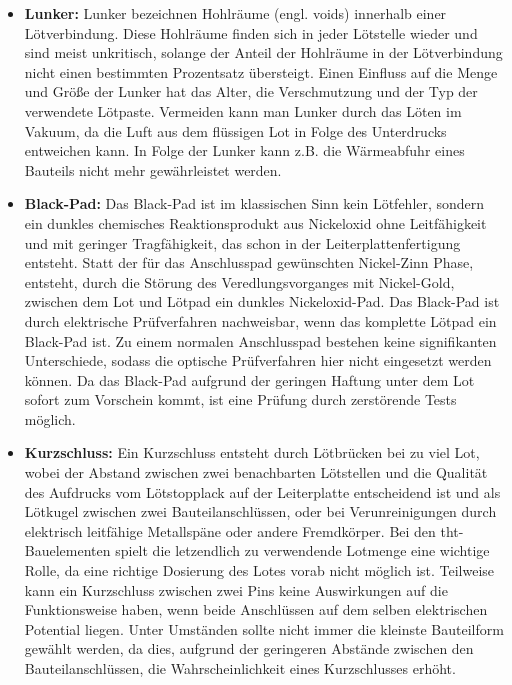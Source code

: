 \begin{itemize}
            \item \textbf{Lunker:} Lunker bezeichnen Hohlräume (engl. voids) innerhalb einer Lötverbindung. Diese Hohlräume finden sich in jeder Lötstelle wieder und sind meist unkritisch, solange der Anteil der Hohlräume in der Lötverbindung nicht einen bestimmten Prozentsatz übersteigt. Einen Einfluss auf die Menge und Größe der Lunker hat das Alter, die Verschmutzung und der Typ der verwendete Lötpaste. Vermeiden kann man Lunker durch das Löten im Vakuum, da die Luft aus dem flüssigen Lot in Folge des Unterdrucks entweichen kann. In Folge der Lunker kann z.B. die Wärmeabfuhr eines Bauteils nicht mehr gewährleistet werden. \cite{berger_test-_2012}
            \item \textbf{Black-Pad:} Das Black-Pad ist im klassischen Sinn kein Lötfehler, sondern ein dunkles chemisches Reaktionsprodukt aus Nickeloxid ohne Leitfähigkeit und mit geringer Tragfähigkeit, das schon in der Leiterplattenfertigung entsteht. Statt der für das Anschlusspad gewünschten Nickel-Zinn Phase, entsteht, durch die Störung des Veredlungsvorganges mit Nickel-Gold, zwischen dem Lot und Lötpad ein dunkles Nickeloxid-Pad. Das Black-Pad ist durch elektrische Prüfverfahren nachweisbar, wenn das komplette Lötpad ein Black-Pad ist. Zu einem normalen Anschlusspad bestehen keine signifikanten Unterschiede, sodass die optische Prüfverfahren hier nicht eingesetzt werden können. Da das Black-Pad aufgrund der geringen Haftung unter dem Lot sofort zum Vorschein kommt, ist eine Prüfung durch zerstörende Tests möglich. \cite{berger_test-_2012}
            \item \textbf{Kurzschluss:} Ein Kurzschluss entsteht durch Lötbrücken bei zu viel Lot, wobei der Abstand zwischen zwei benachbarten Lötstellen und die Qualität des Aufdrucks vom Lötstopplack auf der Leiterplatte entscheidend ist und als Lötkugel zwischen zwei Bauteilanschlüssen, oder bei Verunreinigungen durch elektrisch leitfähige Metallspäne oder andere Fremdkörper. Bei den \ac{tht}-Bauelementen spielt die letzendlich zu verwendende Lotmenge eine wichtige Rolle, da eine richtige Dosierung des Lotes vorab nicht möglich ist. Teilweise kann ein Kurzschluss zwischen zwei Pins keine Auswirkungen auf die Funktionsweise haben, wenn beide Anschlüssen auf dem selben elektrischen Potential liegen. Unter Umständen sollte nicht immer die kleinste Bauteilform gewählt werden, da dies, aufgrund der geringeren Abstände zwischen den Bauteilanschlüssen, die Wahrscheinlichkeit eines Kurzschlusses erhöht. \cite{berger_test-_2012}

\end{itemize}
